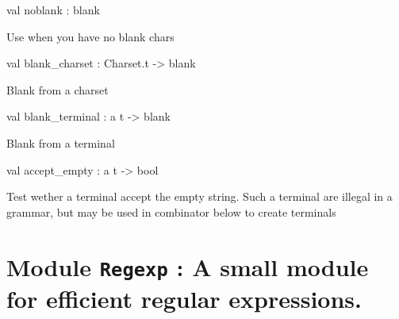 \documentclass[11pt]{article}
\begin{document}
\label{val:Lex.noblank}\begin{ocamldoccode}
val noblank : blank
\end{ocamldoccode}
\begin{ocamldocdescription}
Use when you have no blank chars


\end{ocamldocdescription}




\label{val:Lex.blank-underscorecharset}\begin{ocamldoccode}
val blank_charset : Charset.t -> blank
\end{ocamldoccode}
\begin{ocamldocdescription}
Blank from a charset


\end{ocamldocdescription}




\label{val:Lex.blank-underscoreterminal}\begin{ocamldoccode}
val blank_terminal : {\textquotesingle}a t -> blank
\end{ocamldoccode}
\begin{ocamldocdescription}
Blank from a terminal


\end{ocamldocdescription}




\label{val:Lex.accept-underscoreempty}\begin{ocamldoccode}
val accept_empty : {\textquotesingle}a t -> bool
\end{ocamldoccode}
\begin{ocamldocdescription}
Test wether a terminal accept the empty string. Such a terminal
   are illegal in a grammar, but may be used in combinator below to create
   terminals


\end{ocamldocdescription}


\section{Module {\tt{Regexp}} : A small module for efficient regular expressions.}
\label{module:Regexp}




\ocamldocvspace{0.5cm}
\end{document}
